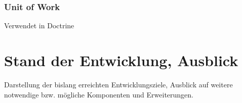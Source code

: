 \documentclass[12pt]{report}
\begin{document}
\subsection{Unit of Work}
Verwendet in Doctrine \cite{ab94} 




\chapter{Stand der Entwicklung, Ausblick}
Darstellung der bislang erreichten Entwicklungsziele, Ausblick auf weitere notwendige bzw. mögliche Komponenten und Erweiterungen.





\end{document}
